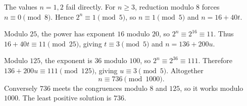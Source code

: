 The values $n=1,2$ fail directly. For $n\ge3$, reduction modulo $8$ forces $n\equiv0\pmod8$. Hence $2^n\equiv1\pmod5$, so $n\equiv1\pmod5$ and $n=16+40t$.

Modulo $25$, the power has exponent $16$ modulo $20$, so $2^n\equiv2^{16}\equiv11$. Thus $16+40t\equiv11\pmod{25}$, giving $t\equiv3\pmod5$ and $n=136+200u$.

Modulo $125$, the exponent is $36$ modulo $100$, so $2^n\equiv2^{36}\equiv111$. Therefore $136+200u\equiv111\pmod{125}$, giving $u\equiv3\pmod5$. Altogether
\[
n\equiv736\pmod{1000}.
\]
Conversely $736$ meets the congruences modulo $8$ and $125$, so it works modulo $1000$. The least positive solution is $\boxed{736}$.
